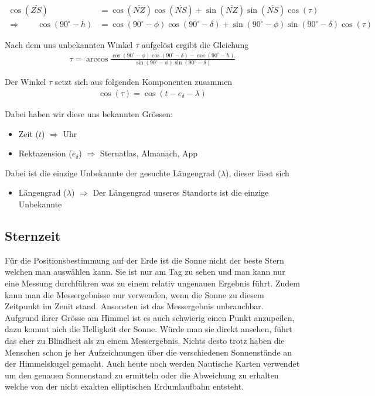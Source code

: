 \begin{refsection}
\begin{align*}
\cos(\overline{ZS}) &= \cos(\overline{NZ}) \cos(\overline{NS}) + \sin(\overline{NZ}) \sin(\overline{NS}) \cos(\tau) \\
\Rightarrow \quad \quad
\cos(90^{\circ} - h) &= \cos(90^{\circ} - \phi) \cos(90^{\circ} - \delta) + \sin(90^{\circ} - \phi)\sin(90^{\circ} - \delta) \cos(\tau)
\end{align*}

Nach dem uns unbekannten Winkel $\tau$ aufgelöst ergibt die Gleichung
\begin{align*}
\tau = \arccos 
\frac{ \cos(90^{\circ} - \phi) \cos(90^{\circ} - \delta) - \cos(90^{\circ} - h)} {\sin(90^{\circ} - \phi)\sin(90^{\circ} - \delta)}
\end{align*}

Der Winkel $\tau$ setzt sich aus folgenden Komponenten zusammen
\begin{align*}
\cos (\tau) = \cos (t - e_\delta - \lambda) 
\end{align*}

Dabei haben wir diese uns bekannten Grössen:
\begin{itemize}
\item Zeit ($t$) $\Rightarrow$ Uhr
\item Rektazension ($e_\delta$) $\Rightarrow$ Sternatlas, Almanach, App 
\end{itemize}


Dabei ist die einzige Unbekannte der gesuchte Längengrad ($\lambda$), dieser lässt sich 
\begin{itemize}
\item Längengrad ($\lambda$) $\Rightarrow$ Der Längengrad unseres Standorts ist die einzige Unbekannte
\end{itemize}

\subsection{Sternzeit}
Für die Positionsbestimmung auf der Erde ist die Sonne nicht der beste Stern welchen man auswählen kann. Sie ist nur am Tag zu sehen und man kann nur eine Messung durchführen was zu einem relativ ungenauen Ergebnis führt. Zudem kann man die Messergebnisse nur verwenden, wenn die Sonne zu diesem Zeitpunkt im Zenit stand. Ansonsten ist das Messergebnis unbrauchbar. Aufgrund ihrer Grösse am Himmel ist es auch schwierig einen Punkt anzupeilen, dazu kommt nich die Helligkeit der Sonne. Würde man sie direkt ansehen, führt das eher zu Blindheit als zu einem Messergebnis.
Nichts desto trotz haben die Menschen schon je her Aufzeichnungen über die verschiedenen Sonnenstände an der Himmelskugel gemacht. Auch heute noch werden Nautische Karten verwendet um den genauen Sonnenstand zu ermitteln oder die Abweichung zu erhalten welche von der nicht exakten elliptischen Erdumlaufbahn entsteht.


\end{refsection}
